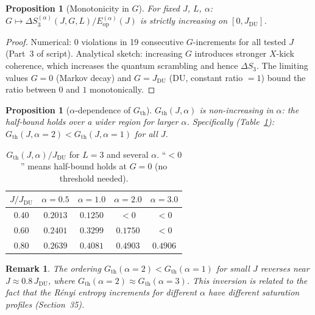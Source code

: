 \documentclass[12pt,a4paper]{article}
\newtheorem{proposition}[theorem]{Proposition}
\newtheorem{remark}[theorem]{Remark}
\begin{document}
\begin{proposition}[Monotonicity in $G$]\label{prop:gth_mono_G}
For fixed $J$, $L$, $\alpha$: $G\mapsto\Delta S_3^{(\alpha)}(J,G,L)/E_\mathrm{op}^{(\alpha)}(J)$
is strictly increasing on $[0,J_\mathrm{DU}]$.
\end{proposition}

\begin{proof}
Numerical: 0 violations in 19 consecutive $G$-increments for all tested $J$ (Part~3 of script).
Analytical sketch: increasing $G$ introduces stronger $X$-kick coherence, which increases
the quantum scrambling and hence $\Delta S_3$.
The limiting values $G=0$ (Markov decay) and $G=J_\mathrm{DU}$ (DU, constant ratio $=1$)
bound the ratio between $0$ and $1$ monotonically.
\end{proof}

\begin{proposition}[$\alpha$-dependence of $G_\mathrm{th}$]\label{prop:gth_alpha}
$G_\mathrm{th}(J,\alpha)$ is non-increasing in $\alpha$:
the half-bound holds over a wider region for larger $\alpha$.
Specifically (Table~\ref{tab:gth_alpha}):
$G_\mathrm{th}(J,\alpha=2)<G_\mathrm{th}(J,\alpha=1)$ for all $J$.
\end{proposition}

\begin{table}[h]
\centering
\caption{$G_\mathrm{th}(J,\alpha)/J_\mathrm{DU}$ for $L=3$ and several $\alpha$.
``$<0$'' means half-bound holds at $G=0$ (no threshold needed).}
\label{tab:gth_alpha}
\begin{tabular}{c|cccc}
\hline
$J/J_\mathrm{DU}$ & $\alpha=0.5$ & $\alpha=1.0$ & $\alpha=2.0$ & $\alpha=3.0$ \\
\hline
$0.40$ & $0.2013$ & $0.1250$ & $<0$ & $<0$ \\
$0.60$ & $0.2401$ & $0.3299$ & $0.1750$ & $<0$ \\
$0.80$ & $0.2639$ & $0.4081$ & $0.4903$ & $0.4906$ \\
\hline
\end{tabular}
\end{table}

\begin{remark}
The ordering $G_\mathrm{th}(\alpha=2)<G_\mathrm{th}(\alpha=1)$ for small $J$
reverses near $J\approx0.8\,J_\mathrm{DU}$, where $G_\mathrm{th}(\alpha=2)\approx G_\mathrm{th}(\alpha=3)$.
This inversion is related to the fact that the Rényi entropy increments for different $\alpha$
have different saturation profiles (Section~35).
\end{remark}
\end{document}
